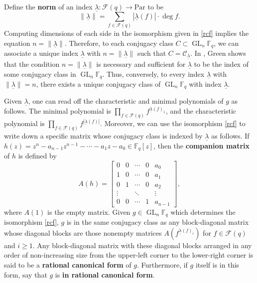 \documentclass[Unicode,ALCO]{cedram}
\DeclareMathOperator{\GL}{GL}
\newcommand{\CC}{\mathcal{C}}
\newcommand{\F}{\mathbb{F}}
\newcommand{\CF}{\mathcal{F}}
\newcommand{\myemph}{\textbf}
\newcommand{\Par}{\text{Par}}
\newcommand{\ulambda}{{\underline{\lambda}}}
\begin{document}
Define the \myemph{norm} of an index \(\ulambda : \CF (q) \to \Par\) to be
\begin{equation}
\| \ulambda \| = \sum_{f \in \CF (q)} |\ulambda (f)| \cdot \deg f.
\end{equation}
Computing dimensions of each side in the isomorphism given in \eqref{rcf} implies the equation $n = \| \ulambda \|$.
Therefore, to each conjugacy class $C \subset \GL_n \F_q$, we can associate a unique index $\ulambda$ with $n = \| \ulambda \|$ such that \(C = \CC_\ulambda\).
In \cite{green}, Green shows that the condition $n = \| \ulambda \|$ is necessary and sufficient for $\ulambda$ to be the index of some conjugacy class in $\GL_n \F_q$.
Thus, conversely, to every index $\ulambda$ with $\| \ulambda \| = n$, there exists a unique conjugacy class of $\GL_n \F_q$ with index $\ulambda$.

Given $\ulambda$, one can read off the characteristic and minimal polynomials of $g$ as follows.
The minimal polynomial is
$\prod_{f \in \CF (q)} f^{\ulambda(f)_1}$,
and the characteristic polynomial is
$\prod_{f \in \CF (q)} f^{|\ulambda (f) |}$.
Moreover, we can use the isomorphism \eqref{rcf} to write down a specific matrix whose conjugacy class is indexed by $\ulambda$ as follows.
If $h(z) = z^n - a_{n-1}z^{n-1} - \cdots - a_1 z - a_0 \in \F_q[z]$, then the \myemph{companion matrix} of $h$ is defined by
$$
A(h) = \begin{bmatrix}
0 & 0 & \cdots & 0 & a_0    \\
1 & 0 & \cdots & 0 & a_1    \\
0 & 1 & \cdots & 0 & a_2    \\
\vdots  &   & \ddots &   & \vdots \\
0 & 0 & \cdots & 1 & a_{n-1}
\end{bmatrix},
$$
where $A(1)$ is the empty matrix.
Given $g \in \GL_n \F_q$ which determines the isomorphism \eqref{rcf}, $g$ is in the same conjugacy class as any block-diagonal matrix
whose diagonal blocks are those nonempty matrices $A(f^{\ulambda(f)_i})$ for $f \in \CF (q)$ and $i \geq 1$.
Any block-diagonal matrix with these diagonal blocks arranged in any order of non-increasing size from the upper-left corner to the lower-right corner is said to be a \myemph{rational canonical form} of $g$.
Furthermore, if $g$ itself is in this form, say that $g$ is \myemph{in rational canonical form}.
\end{document}
